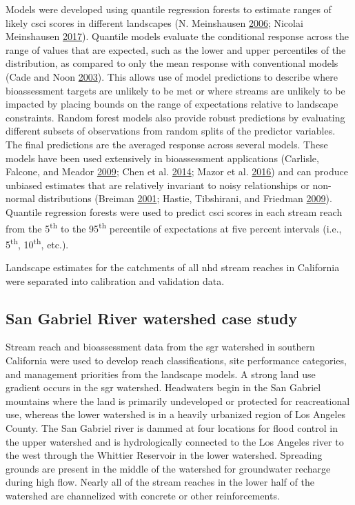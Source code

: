 \documentclass[]{article}
\begin{document}
Models were developed using quantile regression forests to estimate
ranges of likely \ac{csci} scores in different landscapes (N.
Meinshausen \protect\hyperlink{ref-Meinshausen06}{2006}; Nicolai
Meinshausen \protect\hyperlink{ref-Meinshausen17}{2017}). Quantile
models evaluate the conditional response across the range of values that
are expected, such as the lower and upper percentiles of the
distribution, as compared to only the mean response with conventional
models (Cade and Noon \protect\hyperlink{ref-Cade03}{2003}). This allows
use of model predictions to describe where bioassessment targets are
unlikely to be met or where streams are unlikely to be impacted by
placing bounds on the range of expectations relative to landscape
constraints. Random forest models also provide robust predictions by
evaluating different subsets of observations from random splits of the
predictor variables. The final predictions are the averaged response
across several models. These models have been used extensively in
bioassessment applications (Carlisle, Falcone, and Meador
\protect\hyperlink{ref-Carlisle09}{2009}; Chen et al.
\protect\hyperlink{ref-Chen14}{2014}; Mazor et al.
\protect\hyperlink{ref-Mazor16}{2016}) and can produce unbiased
estimates that are relatively invariant to noisy relationships or
non-normal distributions (Breiman
\protect\hyperlink{ref-Breiman01}{2001}; Hastie, Tibshirani, and
Friedman \protect\hyperlink{ref-Hastie09}{2009}). Quantile regression
forests were used to predict \ac{csci} scores in each stream reach from
the 5\textsuperscript{th} to the 95\textsuperscript{th} percentile of
expectations at five percent intervals (i.e., 5\textsuperscript{th},
10\textsuperscript{th}, etc.).

Landscape estimates for the catchments of all \ac{nhd} stream reaches in
California were separated into calibration and validation data.

\subsection{San Gabriel River watershed case
study}\label{san-gabriel-river-watershed-case-study}

Stream reach and bioassessment data from the \ac{sgr} watershed in
southern California were used to develop reach classifications, site
performance categories, and management priorities from the landscape
models. A strong land use gradient occurs in the \ac{sgr} watershed.
Headwaters begin in the San Gabriel mountains where the land is
primarily undeveloped or protected for reacreational use, whereas the
lower watershed is in a heavily urbanized region of Los Angeles County.
The San Gabriel river is dammed at four locations for flood control in
the upper watershed and is hydrologically connected to the Los Angeles
river to the west through the Whittier Reservoir in the lower watershed.
Spreading grounds are present in the middle of the watershed for
groundwater recharge during high flow. Nearly all of the stream reaches
in the lower half of the watershed are channelized with concrete or
other reinforcements.
\end{document}
